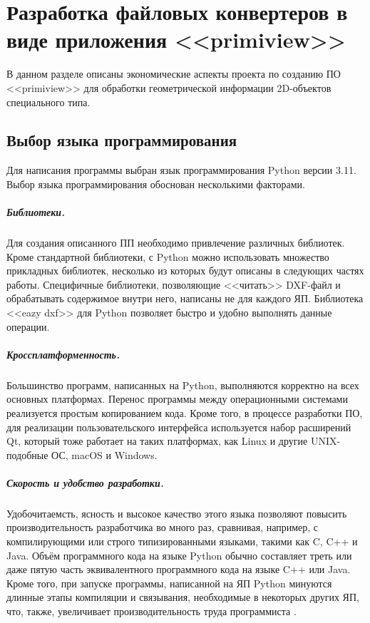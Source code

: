 \chapter{Разработка файловых конвертеров в виде приложения <<primiview>>}
\label{cha:entwickl}

В данном разделе описаны экономические аспекты проекта по созданию ПО <<primiview>> для обработки геометрической информации 2D-объектов специального типа.

\section{Выбор языка программирования}
Для написания программы выбран язык программирования Python версии 3.11. Выбор языка программирования обоснован несколькими факторами.

\paragraph{Библиотеки.} Для создания описанного ПП необходимо привлечение различных библиотек. Кроме стандартной библиотеки, с Python можно использовать множество прикладных библиотек, несколько из которых будут описаны в следующих частях работы. Специфичные библиотеки, позволяющие <<читать>> DXF-файл и обрабатывать содержимое внутри него, написаны не для каждого ЯП. Библиотека <<eazy dxf>> для Python позволяет быстро и удобно выполнять данные операции.

\paragraph{Кроссплатформенность.} Большинство программ, написанных на Python, выполняются корректно на всех основных платформах. Перенос программы между операционными системами реализуется простым копированием кода. Кроме того, в процессе разработки ПО, для реализации пользовательского интерфейса используется набор расширений Qt, который тоже работает на таких платформах, как Linux и другие UNIX-подобные ОС, macOS и Windows.

\paragraph{Скорость и удобство разработки.} Удобочитаемсть, ясность и высокое качество этого языка позволяют повысить производительность разработчика во много раз, сравнивая, например, с компилирующими или строго типизированными языками, такими как C, C++ и Java. Объём программного кода на языке Python обычно составляет треть или даже пятую часть эквивалентного программного кода на языке C++ или Java. Кроме того, при запуске программы, написанной на ЯП Python минуются длинные этапы компиляции и связывания, необходимые в некоторых других ЯП, что, также, увеличивает производительность труда программиста \cite{ascher2004learning}.


